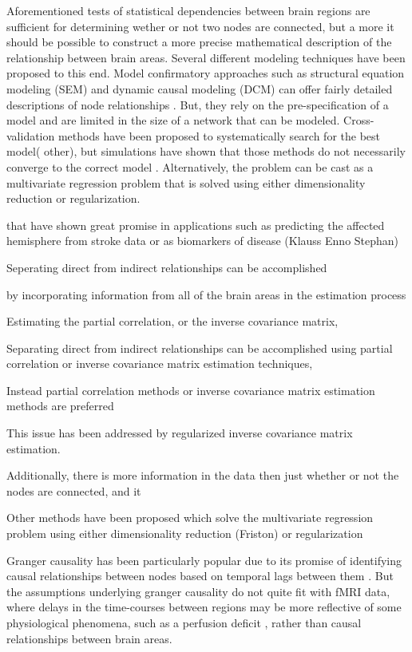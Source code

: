 Aforementioned tests of statistical dependencies between brain regions are sufficient for determining wether or not two nodes are connected, but a more  it should be possible to construct a more precise mathematical description of the relationship between brain areas. Several different modeling techniques have been proposed to this end. Model confirmatory approaches such as structural equation modeling (SEM) and dynamic causal modeling (DCM) can offer fairly detailed descriptions of node relationships . But, they rely on the pre-specification of a model and are limited in the size of a network that can be modeled. Cross-validation methods have been proposed to systematically search for the best model(\cite{GAJames} other), but simulations have shown that those methods do not necessarily converge to the correct model \cite{lohman}. Alternatively, the problem can be cast as a multivariate regression problem that is solved using either dimensionality reduction or regularization. 

that have shown great promise in applications such as predicting the affected hemisphere from stroke data \cite{GAJames} or as biomarkers of disease (Klauss Enno Stephan)


Seperating direct from indirect relationships can be accomplished 

by incorporating information from all of the brain areas in the estimation process

Estimating the partial correlation, or the inverse covariance matrix, 

Separating direct from indirect relationships can be accomplished using partial correlation or inverse covariance matrix estimation techniques, 


Instead partial correlation methods or inverse covariance matrix estimation methods are preferred

This issue has been addressed by regularized inverse covariance matrix estimation. 

Additionally, there is more information in the data then just whether or not the nodes are connected, and it  

Other methods have been proposed which solve the multivariate regression problem using either dimensionality reduction (Friston) or regularization

Granger causality has been particularly popular due to its promise of identifying causal relationships between nodes based on temporal lags between them \cite{}. But the assumptions underlying granger causality do not quite fit with fMRI data, where delays in the time-courses between regions may be more reflective of some physiological phenomena, such as a perfusion deficit \cite{Lv}, rather than causal relationships between brain areas. 

